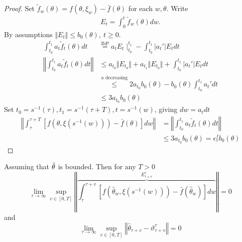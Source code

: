 \begin{proof}
    Set \(\tilde{f}_w(\theta)=f(\theta,\xi_w)-\bar{f}(\theta)\) for each \(w,\theta\). Write 
    \begin{align*}
        E_t=\int_0^t\tilde{f}_w(\theta)dw.
    \end{align*}
    By assumptions \(\Vert E_t\Vert\leq b_0(\theta),\ t\geq 0\).
    \begin{align*}
        \int_{t_0}^{t_1} a_t \tilde{f}_t(\theta)dt&\stackrel{\text{IbP}}{=}a_tE_t\mid_{t_0}^{t_1}-\int_{t_0}^{t_1}\vert a_t'\vert E_tdt \\
        \left\Vert \int_{t_0}^{t_1} a_t \tilde{f}_t(\theta)dt\right\Vert &\leq a_{t_0}\Vert E_{t_0}\Vert+ a_{t_1}\Vert E_{t_0}\Vert+\int_{t_0}^{t_1} \vert a_t'\vert E_tdt\\
        &\stackrel{a \text{ decreasing}}{\leq} 2 a_{t_0}b_0(\theta)-b_0(\theta)\int_{t_0}^{t_1} a_t' dt\\
        &\leq 3 a_{t_0} b_0(\theta) 
    \end{align*}
    Set \(t_0=s^{-1}(\tau),t_1=s^{-1}(\tau+T), t=s^{-1}(w)\),
    giving \(dw=a_tdt\)
    \begin{align*}
        \left\Vert \int_{\tau}^{\tau+T} [f(\theta,\xi(s^{-1}(w)))-\bar{f}(\theta)]dw \right\Vert&=
        \left\Vert \int_{t_0}^{t_1} a_t \tilde{f}_t(\theta)dt\right\Vert\\
        &\leq 3a_{t_0}b_0(\theta)=\epsilon_\tau^f b_0(\theta)
    \end{align*}
\end{proof}

\begin{proposition}\label{prop:38}
    Assuming that \({\hat{\theta}}\) is bounded. Then for any \(T>0\)
    \[\lim_{\tau\to\infty}\sup_{v\in[0,T]}\left\Vert \overbrace{\int_\tau^{\tau+v}\left[f(\hat{\theta}_w, \xi(s^{-1}(w)))-\bar{f}(\hat{\theta}_w)\right]dw}^{E_{\tau+v}^{\tau}}\right\Vert=0\]
    and 
    \[\lim_{\tau\to\infty}\sup_{v\in[0,T]}\left\Vert \hat{\theta}_{\tau+v}-\vartheta_{\tau+v}^\tau \right\Vert=0\]
\end{proposition}

